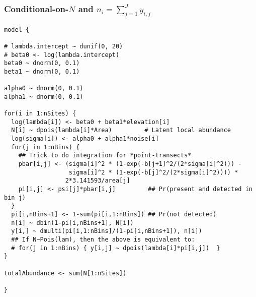 \documentclass[color=usenames,dvipsnames]{beamer}\usepackage[]{graphicx}\usepackage[]{xcolor}
\makeatletter
\newenvironment{kframe}{%
 \def\at@end@of@kframe{}%
 \ifinner\ifhmode%
  \def\at@end@of@kframe{\end{minipage}}%
  \begin{minipage}{\columnwidth}%
 \fi\fi%
 \def\FrameCommand##1{\hskip\@totalleftmargin \hskip-\fboxsep
 \colorbox{shadecolor}{##1}\hskip-\fboxsep
     \hskip-\linewidth \hskip-\@totalleftmargin \hskip\columnwidth}%
 \MakeFramed {\advance\hsize-\width
   \@totalleftmargin\z@ \linewidth\hsize
   \@setminipage}}%
 {\par\unskip\endMakeFramed%
 \at@end@of@kframe}
\newenvironment{knitrout}{}{} %
\makeatother
\begin{document}
\begin{frame}[fragile]
  \frametitle{\normalsize Conditional-on-$N$ and $n_i=\sum_{j=1}^{J} y_{i,j}$}
\vspace{-3pt}
\begin{knitrout}\tiny
{}\color{fgcolor}\begin{kframe}
\begin{verbatim}
model {

# lambda.intercept ~ dunif(0, 20)
# beta0 <- log(lambda.intercept)
beta0 ~ dnorm(0, 0.1)
beta1 ~ dnorm(0, 0.1)

alpha0 ~ dnorm(0, 0.1)
alpha1 ~ dnorm(0, 0.1)

for(i in 1:nSites) {
  log(lambda[i]) <- beta0 + beta1*elevation[i]
  N[i] ~ dpois(lambda[i]*Area)         # Latent local abundance
  log(sigma[i]) <- alpha0 + alpha1*noise[i]
  for(j in 1:nBins) {
    ## Trick to do integration for *point-transects*
    pbar[i,j] <- (sigma[i]^2 * (1-exp(-b[j+1]^2/(2*sigma[i]^2))) -
                  sigma[i]^2 * (1-exp(-b[j]^2/(2*sigma[i]^2)))) * 
                 2*3.141593/area[j]     
    pi[i,j] <- psi[j]*pbar[i,j]         ## Pr(present and detected in bin j)
  }
  pi[i,nBins+1] <- 1-sum(pi[i,1:nBins]) ## Pr(not detected)
  n[i] ~ dbin(1-pi[i,nBins+1], N[i])
  y[i,] ~ dmulti(pi[i,1:nBins]/(1-pi[i,nBins+1]), n[i])
  ## If N~Pois(lam), then the above is equivalent to:
  # for(j in 1:nBins) { y[i,j] ~ dpois(lambda[i]*pi[i,j])  }
}

totalAbundance <- sum(N[1:nSites])

}
\end{verbatim}
\end{kframe}
\end{knitrout}
\end{frame}
\end{document}
